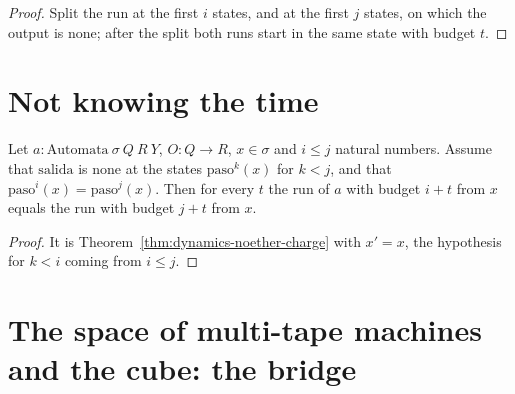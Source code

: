 \begin{proof}
  \leanok
  Split the run at the first $i$ states, and at the first $j$ states, on which the output is
  $\mathrm{none}$; after the split both runs start in the same state with budget $t$.
\end{proof}

\section{Not knowing the time}
\label{sec:dynamics-time}

\begin{theorem}
  \label{thm:dynamics-no-time}
  \leanok
  Let $a : \mathrm{Automata}\ \sigma\ Q\ R\ Y$, $O : Q \to R$, $x \in \sigma$ and $i \le j$ natural
  numbers. Assume that $\mathrm{salida}$ is $\mathrm{none}$ at the states $\mathrm{paso}^{k}(x)$
  for $k < j$, and that $\mathrm{paso}^{i}(x) = \mathrm{paso}^{j}(x)$. Then for every $t$ the run of
  $a$ with budget $i + t$ from $x$ equals the run with budget $j + t$ from $x$.
  \own{}
\end{theorem}

\begin{proof}
  \leanok
  It is Theorem~\ref{thm:dynamics-noether-charge} with $x' = x$, the hypothesis for $k < i$ coming
  from $i \le j$.
\end{proof}

\section{The space of multi-tape machines and the cube: the bridge}
\label{sec:dynamics-bridge}

